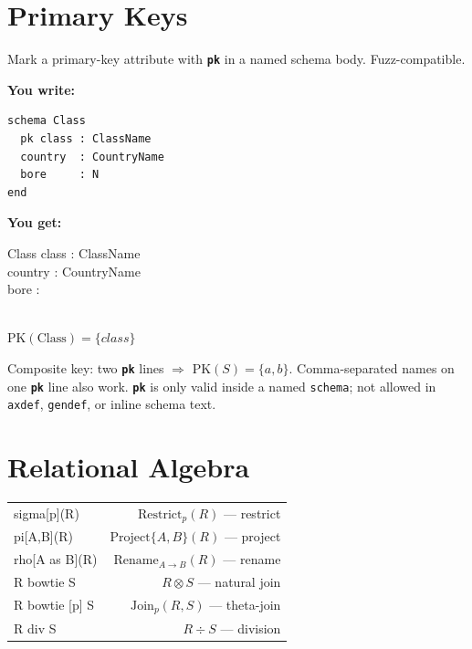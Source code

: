 \documentclass[10pt,landscape,a4paper]{article}
\newcommand{\kw}[1]{\texttt{\bfseries #1}}
\newenvironment{exwrite}%
  {\par\noindent\scriptsize\textbf{You write:}\par\vspace{0pt}\scriptsize}%
  {\vspace{1pt}}
\newenvironment{exget}%
  {\par\noindent\scriptsize\textbf{You get:}\par\vspace{0pt}\small}%
  {\par\vspace{3pt}}
\begin{document}
\begin{multicols}{3}
\raggedcolumns

\section{Primary Keys}

{\scriptsize Mark a primary-key attribute with \kw{pk} in a named schema body. Fuzz-compatible.}

\begin{exwrite}
\begin{verbatim}
schema Class
  pk class : ClassName
  country  : CountryName
  bore     : N
end
\end{verbatim}
\end{exwrite}
\begin{exget}
\begin{center}
\begin{schema}{Class}
class : ClassName \\
country : CountryName \\
bore : \nat
\end{schema}\\[2pt]
\noindent$\mathrm{PK}(\mathrm{Class}) = \{class\}$
\end{center}
\end{exget}

{\scriptsize Composite key: two \kw{pk} lines $\Rightarrow$ $\mathrm{PK}(S)=\{a,b\}$.
Comma-separated names on one \kw{pk} line also work.
\kw{pk} is only valid inside a named \texttt{schema}; not allowed in \texttt{axdef}, \texttt{gendef}, or inline schema text.}

\section{Relational Algebra}

\begin{tabularx}{\columnwidth}{LR}
sigma[p](R)          & $\mathrm{Restrict}_{p}(R)$ — restrict \\
pi[A,B](R)           & $\mathrm{Project}\{A,B\}(R)$ — project \\
rho[A as B](R)       & $\mathrm{Rename}_{A \to B}(R)$ — rename \\
R bowtie S           & $R \otimes S$ — natural join \\
R bowtie [p] S       & $\mathrm{Join}_{p}(R, S)$ — theta-join \\
R div S              & $R \div S$ — division \\
\end{tabularx}


\end{multicols}
\end{document}
